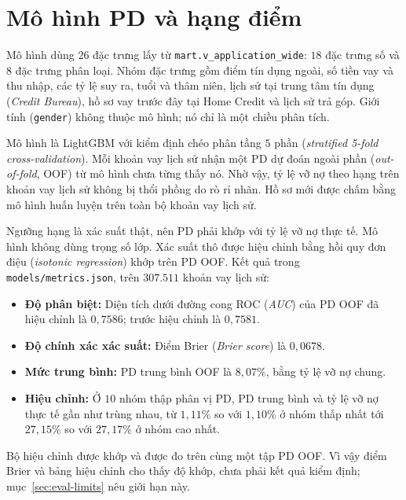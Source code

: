 \section{Mô hình PD và hạng điểm}
\label{sec:dss-model}
Mô hình dùng $26$ đặc trưng lấy từ \texttt{mart.v\_application\_wide}: $18$ đặc trưng số và $8$ đặc trưng phân loại. Nhóm đặc trưng gồm điểm tín dụng ngoài, số tiền vay và thu nhập, các tỷ lệ suy ra, tuổi và thâm niên, lịch sử tại trung tâm tín dụng (\textit{Credit Bureau}), hồ sơ vay trước đây tại Home Credit và lịch sử trả góp. Giới tính (\texttt{gender}) không thuộc mô hình; nó chỉ là một chiều phân tích.

\medskip

Mô hình là LightGBM với kiểm định chéo phân tầng $5$ phần (\textit{stratified 5-fold cross-validation}). Mỗi khoản vay lịch sử nhận một PD dự đoán ngoài phần (\textit{out-of-fold}, OOF) từ mô hình chưa từng thấy nó. Nhờ vậy, tỷ lệ vỡ nợ theo hạng trên khoản vay lịch sử không bị thổi phồng do rò rỉ nhãn. Hồ sơ mới được chấm bằng mô hình huấn luyện trên toàn bộ khoản vay lịch sử.

\medskip

Ngưỡng hạng là xác suất thật, nên PD phải khớp với tỷ lệ vỡ nợ thực tế. Mô hình không dùng trọng số lớp. Xác suất thô được hiệu chỉnh bằng hồi quy đơn điệu (\textit{isotonic regression}) khớp trên PD OOF. Kết quả trong \texttt{models/metrics.json}, trên $307.511$ khoản vay lịch sử:
\begin{itemize}[topsep=0pt, itemsep=1pt]
	\item \textbf{Độ phân biệt:} Diện tích dưới đường cong ROC (\textit{AUC}) của PD OOF đã hiệu chỉnh là $0{,}7586$; trước hiệu chỉnh là $0{,}7581$.
	\item \textbf{Độ chính xác xác suất:} Điểm Brier (\textit{Brier score}) là $0{,}0678$.
	\item \textbf{Mức trung bình:} PD trung bình OOF là $8{,}07\%$, bằng tỷ lệ vỡ nợ chung.
	\item \textbf{Hiệu chỉnh:} Ở $10$ nhóm thập phân vị PD, PD trung bình và tỷ lệ vỡ nợ thực tế gần như trùng nhau, từ $1{,}11\%$ so với $1{,}10\%$ ở nhóm thấp nhất tới $27{,}15\%$ so với $27{,}17\%$ ở nhóm cao nhất.
\end{itemize}

Bộ hiệu chỉnh được khớp và được đo trên cùng một tập PD OOF. Vì vậy điểm Brier và bảng hiệu chỉnh cho thấy độ khớp, chưa phải kết quả kiểm định; mục~\ref{sec:eval-limits} nêu giới hạn này.

